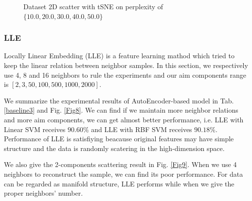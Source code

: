\documentclass{article}
\begin{document}
\begin{figure}[htbp]
{}
\quad
{}
\quad
{}
\quad
{}
\caption{Dataset 2D scatter with tSNE on perplexity of $\{10.0,20.0,30.0,40.0,50.0\}$}
\label{Fig7}
\end{figure}

\subsubsection{LLE}
Locally Linear Embedding (LLE) is a feature learning mathod which tried to keep the linear relation between neighbor samples. In this section, we respectively use 4, 8 and 16 neighbors to rule the experiments and our aim components range is $[2, 3, 50, 100, 500, 1000, 2000]$.

We summarize the experimental results of AutoEncoder-based model in Tab. \ref{baseline3} and Fig. \ref{Fig8}. We can find if we maintain more neighbor relations and more aim components, we can get almost better performance, i.e. LLE with Linear SVM receives $90.60\%$ and LLE with RBF SVM receives $90.18\%$. Performance of LLE is satisfiying beacause original features may have simple structure and the data is randomly scatering in the high-dimension space.

We also give the 2-components scattering result in Fig. \ref{Fig9}. When we use 4 neighbors to reconstruct the sample, we can find its poor performance. For data can be regarded as manifold structure, LLE performs while when we give the proper neighbors' number.
\end{document}

